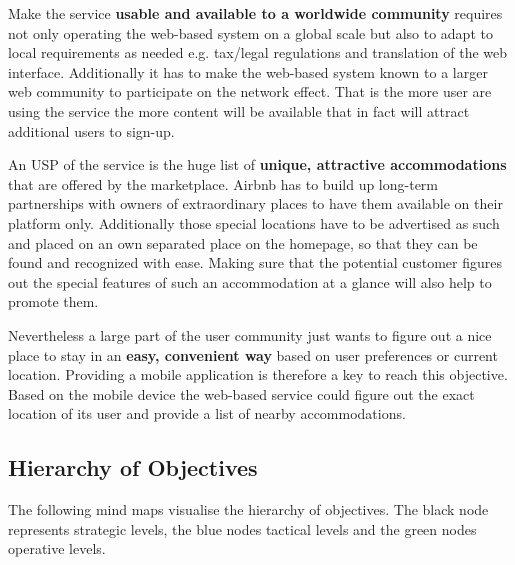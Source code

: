 Make the service {\bf usable and available to a worldwide community} requires not only operating the web-based system on a global scale but also to adapt to local requirements as needed e.g. tax/legal regulations and translation of the web interface. Additionally it has to make the web-based system known to a larger web community to participate on the network effect. That is the more user are using the service the more content will be available that in fact will attract additional users to sign-up.
\vspace{0.2cm}

An USP of the service is the huge list of {\bf unique, attractive accommodations} that are offered by the marketplace. Airbnb has to build up long-term partnerships with owners of extraordinary places to have them available on their platform only. Additionally those special locations have to be advertised as such and placed on an own separated place on the homepage, so that they can be found and recognized with ease. Making sure that the potential customer figures out the special features of such an accommodation at a glance will also help to promote them. 
\vspace{0.2cm}

Nevertheless a large part of the user community just wants to figure out a nice place to stay in an {\bf easy, convenient way} based on user preferences or current location. Providing a mobile application is therefore a key to reach this objective. Based on the mobile device the web-based service could figure out the exact location of its user and provide a list of nearby accommodations.

\subsection{Hierarchy of Objectives} %
\label{sec:hierarchy_objectives}
The following mind maps visualise the hierarchy of objectives. The black node represents strategic levels, the blue nodes tactical levels and the green nodes operative levels.

\vspace*{\fill}

